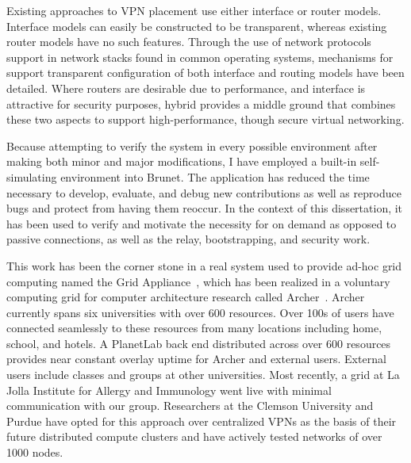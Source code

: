 Existing approaches to VPN placement use either interface or router models.
Interface models can easily be constructed to be transparent, whereas existing
router models have no such features.  Through the use of network protocols
support in network stacks found in common operating systems, mechanisms for
support transparent configuration of both interface and routing models have
been detailed.  Where routers are desirable due to performance, and interface
is attractive for security purposes, hybrid provides a middle ground that
combines these two aspects to support high-performance, though secure virtual
networking.

Because attempting to verify the system in every possible environment after
making both minor and major modifications, I have employed a built-in
self-simulating environment into Brunet.  The application has reduced the time
necessary to develop, evaluate, and debug new contributions as well as
reproduce bugs and protect from having them reoccur.  In the context of this
dissertation, it has been used to verify and motivate the necessity for on
demand as opposed to passive connections, as well as the relay, bootstrapping,
and security work.

This work has been the corner stone in a real system used to provide ad-hoc
grid computing named the Grid Appliance~\cite{gridappliance}, which has been
realized in a voluntary computing grid for computer architecture research
called Archer~\cite{archer}.  Archer currently spans six universities with over
600 resources.  Over 100s of users have connected seamlessly to these resources
from many locations including home, school, and hotels.  A PlanetLab back end
distributed across over 600 resources provides near constant overlay uptime for
Archer and external users.  External users include classes and groups at other
universities.  Most recently, a grid at La Jolla Institute for Allergy and
Immunology went live with minimal communication with our group.  Researchers at
the Clemson University and Purdue have opted for this approach over centralized
VPNs as the basis of their future distributed compute clusters and have
actively tested networks of over 1000 nodes.

